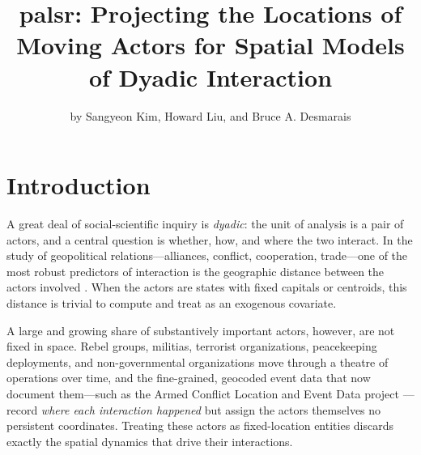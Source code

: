 \title{palsr: Projecting the Locations of Moving Actors for Spatial Models of
Dyadic Interaction}
\author{by Sangyeon Kim, Howard Liu, and Bruce A. Desmarais}

\maketitle


\section{Introduction}

A great deal of social-scientific inquiry is \emph{dyadic}: the unit of analysis
is a pair of actors, and a central question is whether, how, and where the two
interact. In the study of geopolitical relations---alliances, conflict,
cooperation, trade---one of the most robust predictors of interaction is the
geographic distance between the actors involved \citep{gleditsch2001, ward2007}.
When the actors are states with fixed capitals or centroids, this distance is
trivial to compute and treat as an exogenous covariate.

A large and growing share of substantively important actors, however, are not
fixed in space. Rebel groups, militias, terrorist organizations, peacekeeping
deployments, and non-governmental organizations move through a theatre of
operations over time, and the fine-grained, geocoded event data that now document
them---such as the Armed Conflict Location and Event Data project
\citep[ACLED;][]{acled}---record \emph{where each interaction happened} but assign
the actors themselves no persistent coordinates. Treating these actors as
fixed-location entities discards exactly the spatial dynamics that drive their
interactions.

